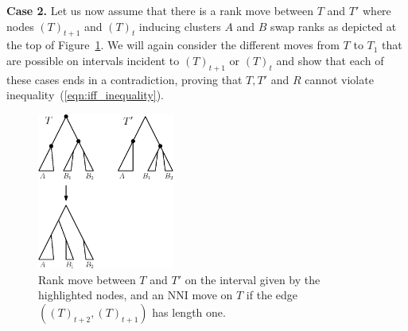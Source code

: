 \documentclass{amsart}
\newcommand{\nni}{\mathrm{NNI}}
\begin{document}
\textbf{Case 2.} Let us now assume that there is a rank move between $T$ and $T'$ where nodes $(T)_{t+1}$ and $(T)_t$ inducing clusters $A$ and $B$ swap ranks as depicted at the top of Figure~\ref{fig:thm_fp_rank1}.
We will again consider the different moves from $T$ to $T_1$ that are possible on intervals incident to $(T)_{t+1}$ or $(T)_{t}$ and show that each of these cases ends in a contradiction, proving that $T,T'$ and $R$ cannot violate inequality~(\ref{eqn:iff_inequality}).

\begin{figure}[!hbt]
\centering
\includegraphics[width=0.4\textwidth]{thm_fp_rank1}
\vspace{12pt}
\caption{Rank move between $T$ and $T'$ on the interval given by the highlighted nodes, and an $\nni$ move on $T$ if the edge $((T)_{t+2},(T)_{t+1})$ has length one.}
\label{fig:thm_fp_rank1}
\end{figure}
\end{document}
